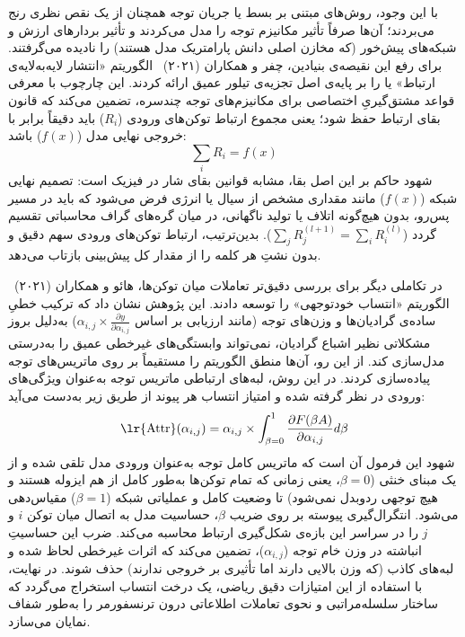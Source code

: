 با این وجود، روش‌های مبتنی بر بسط یا جریان توجه همچنان از یک نقص نظری رنج می‌بردند؛ آن‌ها صرفاً تأثیر مکانیزم توجه را مدل می‌کردند و تأثیر بردارهای ارزش و شبکه‌های پیش‌خور (که مخازن اصلی دانش پارامتریک مدل هستند) را نادیده می‌گرفتند. برای رفع این نقیصه‌ی بنیادین، چفر و همکاران (۲۰۲۱)~\cite{chefer2021transformer} الگوریتم «انتشار لایه‌به‌لایه‌ی ارتباط» یا  را بر پایه‌ی اصل تجزیه‌ی تیلور عمیق ارائه کردند. این چارچوب با معرفی قواعد مشتق‌گیریِ اختصاصی برای مکانیزم‌های توجه چندسره، تضمین می‌کند که قانون بقای ارتباط حفظ شود؛ یعنی مجموع ارتباط توکن‌های ورودی ($R_i$) باید دقیقاً برابر با خروجی نهایی مدل ($f(x)$) باشد:
\begin{equation}\label{eq:chap3_conservation_of_relevance}
    \sum_i R_i = f(x)
\end{equation}
شهود حاکم بر این اصل بقا، مشابه قوانین بقای شار در فیزیک است: تصمیم نهایی شبکه ($f(x)$) مانند مقداری مشخص از سیال یا انرژی فرض می‌شود که باید در مسیر پس‌رو، بدون هیچ‌گونه اتلاف یا تولید ناگهانی، در میان گره‌های گراف محاسباتی تقسیم گردد ($\sum_j R_j^{(l+1)} = \sum_i R_i^{(l)}$). بدین‌ترتیب، ارتباط توکن‌های ورودی سهم دقیق و بدون نشتِ هر کلمه را از مقدار کل پیش‌بینی بازتاب می‌دهد.

در تکاملی دیگر برای بررسی دقیق‌تر تعاملات میان توکن‌ها، هائو و همکاران (۲۰۲۱)~\cite{hao2021selfattention} الگوریتم «انتساب خودتوجهی» را توسعه دادند. این پژوهش نشان داد که ترکیب خطیِ ساده‌ی گرادیان‌ها و وزن‌های توجه (مانند ارزیابی بر اساس $\alpha_{i,j} \times \frac{\partial y}{\partial \alpha_{i,j}}$) به‌دلیل بروز مشکلاتی نظیر اشباع گرادیان، نمی‌تواند وابستگی‌های غیرخطی عمیق را به‌درستی مدل‌سازی کند. از این رو، آن‌ها منطق الگوریتم  را مستقیماً بر روی ماتریس‌های توجه پیاده‌سازی کردند. در این روش، لبه‌های ارتباطی ماتریس توجه به‌عنوان ویژگی‌های ورودی در نظر گرفته شده و امتیاز انتساب هر پیوند از طریق زیر به‌دست می‌آید:
\begin{equation}\label{eq:chap3_selfattention_attribution}
    \text{\lr{Attr}}(\alpha_{i,j}) = \alpha_{i,j} \times \int_{\beta=0}^{1} \frac{\partial F(\beta A)}{\partial \alpha_{i,j}} d\beta
\end{equation}
شهود این فرمول آن است که ماتریس کامل توجه به‌عنوان ورودی مدل تلقی شده و از یک مبنای خنثی ($\beta=0$، یعنی زمانی که تمام توکن‌ها به‌طور کامل از هم ایزوله هستند و هیچ توجهی ردوبدل نمی‌شود) تا وضعیت کامل و عملیاتی شبکه ($\beta=1$) مقیاس‌دهی می‌شود. انتگرال‌گیری پیوسته بر روی ضریب $\beta$، حساسیت مدل به اتصال میان توکن $i$ و $j$ را در سراسر این بازه‌ی شکل‌گیری ارتباط محاسبه می‌کند. ضرب این حساسیتِ انباشته در وزن خام توجه ($\alpha_{i,j}$)، تضمین می‌کند که اثرات غیرخطی لحاظ شده و لبه‌های کاذب (که وزن بالایی دارند اما تأثیری بر خروجی ندارند) حذف شوند. در نهایت، با استفاده از این امتیازات دقیق ریاضی، یک درخت انتساب استخراج می‌گردد که ساختار سلسله‌مراتبی و نحوی تعاملات اطلاعاتی درون ترنسفورمر را به‌طور شفاف نمایان می‌سازد.

